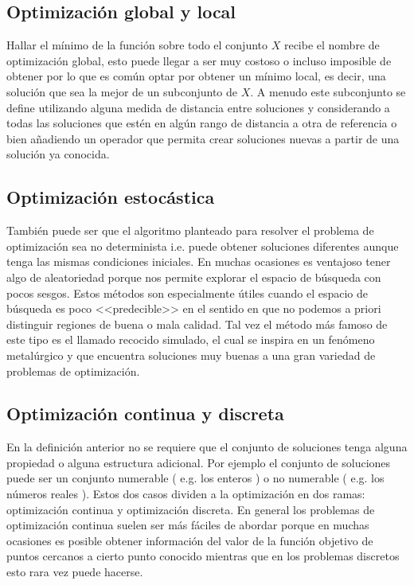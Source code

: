 \subsection*{Optimización global y local}

Hallar el mínimo de la función sobre todo el conjunto $X$ recibe el nombre de optimización global, esto puede llegar a ser muy costoso o incluso imposible de obtener por lo que es común optar por obtener un mínimo local, es decir, una solución que sea la mejor de un subconjunto de $X$. A menudo este subconjunto se define utilizando alguna medida de distancia entre soluciones y considerando a todas las soluciones que estén en algún rango de distancia a otra de referencia o bien añadiendo un operador que permita crear soluciones nuevas a partir de una solución ya conocida. \\

\subsection*{Optimización estocástica}
También puede ser que el algoritmo planteado para resolver el problema de optimización sea no determinista i.e. puede obtener soluciones diferentes aunque tenga las mismas condiciones iniciales. En muchas ocasiones es ventajoso tener algo de aleatoriedad porque nos permite explorar el espacio de búsqueda con pocos sesgos. Estos métodos son especialmente útiles cuando el espacio de búsqueda es poco <<predecible>> en el sentido en que no podemos a priori distinguir regiones de buena o mala calidad. Tal vez el método más famoso de este tipo es el llamado recocido simulado, el cual se inspira en un fenómeno metalúrgico y que encuentra soluciones muy buenas a una gran variedad de problemas de optimización.

\subsection*{Optimización continua y discreta}
 En la definición anterior no se requiere que el conjunto de soluciones tenga alguna propiedad o alguna estructura adicional. Por ejemplo el conjunto de soluciones puede ser un conjunto numerable ( e.g. los enteros ) o no numerable ( e.g. los números reales ). Estos dos casos dividen a la optimización en dos ramas: optimización continua y optimización discreta. En general los problemas de optimización continua suelen ser más fáciles de abordar\cite{nocedal2006numerical} porque en muchas ocasiones es posible obtener información del valor de la función objetivo de puntos cercanos a cierto punto conocido mientras que en los problemas discretos esto rara vez puede hacerse.\\

